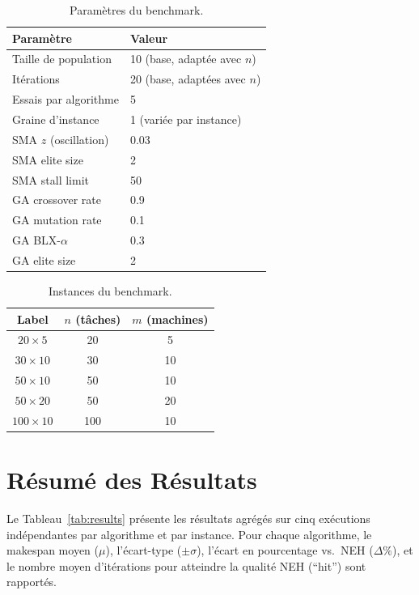\documentclass[12pt,a4paper,oneside]{report}
\begin{document}
\begin{table}[H]
\centering
\caption{Param\`etres du benchmark.}
\label{tab:params}
\begin{tabular}{@{}ll@{}}
\toprule
Param\`etre       & Valeur \\
\midrule
Taille de population & 10 (base, adapt\'ee avec $n$) \\
It\'erations      & 20 (base, adapt\'ees avec $n$) \\
Essais par algorithme & 5 \\
Graine d'instance   & 1 (vari\'ee par instance) \\
SMA $z$ (oscillation) & 0.03 \\
SMA elite size  & 2 \\
SMA stall limit & 50 \\
GA crossover rate & 0.9 \\
GA mutation rate & 0.1 \\
GA BLX-$\alpha$ & 0.3 \\
GA elite size   & 2 \\
\bottomrule
\end{tabular}
\end{table}

\begin{table}[H]
\centering
\caption{Instances du benchmark.}
\label{tab:instances}
\begin{tabular}{@{}ccc@{}}
\toprule
Label       & $n$ (t\^aches) & $m$ (machines) \\
\midrule
$20 \times 5$   & 20  & 5  \\
$30 \times 10$  & 30  & 10 \\
$50 \times 10$  & 50  & 10 \\
$50 \times 20$  & 50  & 20 \\
$100 \times 10$ & 100 & 10 \\
\bottomrule
\end{tabular}
\end{table}

\section{R\'esum\'e des R\'esultats}

Le Tableau~\ref{tab:results} pr\'esente les r\'esultats agr\'eg\'es sur cinq ex\'ecutions ind\'ependantes par algorithme et par instance. Pour chaque algorithme, le makespan moyen ($\mu$), l'\'ecart-type ($\pm\sigma$), l'\'ecart en pourcentage vs.\ NEH ($\Delta\%$), et le nombre moyen d'it\'erations pour atteindre la qualit\'e NEH (``hit'') sont rapport\'es.
\end{document}
